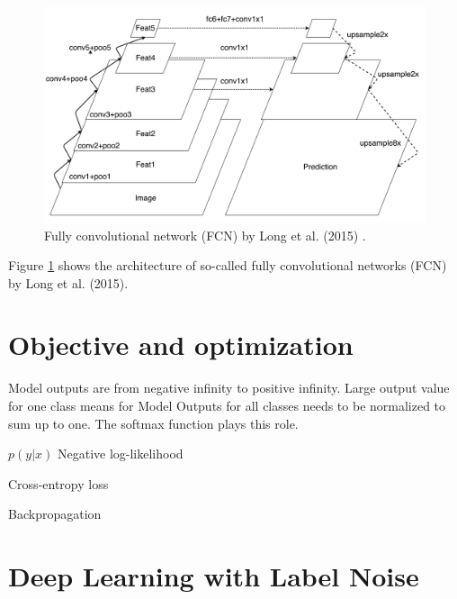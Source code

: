 
\begin{figure}[t]
\centering
   \includegraphics[width=\linewidth]{img/fcn}
\caption{Fully convolutional network (FCN) by Long et al. (2015)  \cite{long2015fully}.}
\label{fig:fcn}
\end{figure}

Figure \ref{fig:fcn} shows the architecture of so-called fully convolutional networks (FCN) by Long et al. (2015).




\section{Objective and optimization}

Model outputs are from negative infinity to positive infinity.
Large output value for one class means for
Model Outputs for all classes needs to be normalized to sum up to one.
The softmax function plays this role.

$p(y \vert x)$
Negative log-likelihood

Cross-entropy loss

Backpropagation



\section{Deep Learning with Label Noise}
